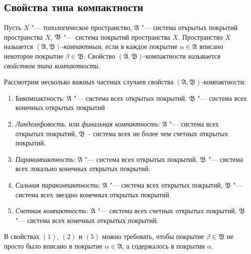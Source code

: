 \subsection{Свойства типа компактности}

\begin{definition}
    Пусть $X$ "--- топологическое пространство, $\mathfrak{A}$ "--- система открытых покрытий пространства $X$, $\mathfrak B$ "--- система покрытий пространства $X$. Пространство $X$ назыается \textit{$(\mathfrak{A},\mathfrak{B})$-компактным}, если в каждое покрытие $\alpha\in\mathfrak{A}$ вписано некоторое покрытие $\beta \in \mathfrak{B}$. Свойство $(\mathfrak{A},\mathfrak{B})$-компактности называется \textit{свойством типа компактности}.
\end{definition}

\begin{example}
    Рассмотрим несколько важных частных случаев свойства $(\mathfrak{A},\mathfrak{B})$-компактности:
    \begin{enumerate}
        \item Бикомпактность: $\mathfrak{A}$ "--- система всех открытых покрытий, $\mathfrak{B}$ "--- система всех конечных открытых покрытий
        
        \item \textit{Линделефовость}, или \textit{финальная компактность}: $\mathfrak{A}$ "--- система всех открытых покрытий, $\mathfrak{B}$ -- система всех не более чем счетных открытых покрытий.
        
        \item \textit{Паракомпактность}: $\mathfrak{A}$ "--- система всех открытых покрытий, $\mathfrak{B}$ "--- система всех локально конечных открытых покрытий.
        
        \item \textit{Сильная паракомпактность}: $\mathfrak{A}$ "--- система всех открытых покрытий, $\mathfrak{B}$ "--- система всех звездно конечных открытых покрытий.

        \item \textit{Счетная компактность}: $\mathfrak{A}$ "--- система всех счетных открытых покрытий, $\mathfrak{B}$ "--- система всех конечных открытых покрытий.
    \end{enumerate}
\end{example}

\begin{note}
    В свойствах $(1)$, $(2)$ и $(5)$ можно требовать, чтобы покрытие $\beta\in\mathfrak{B}$ не просто было вписано в покрытие $\alpha\in\mathfrak{A}$, а содержалось в покрытии $\alpha$.
\end{note}

